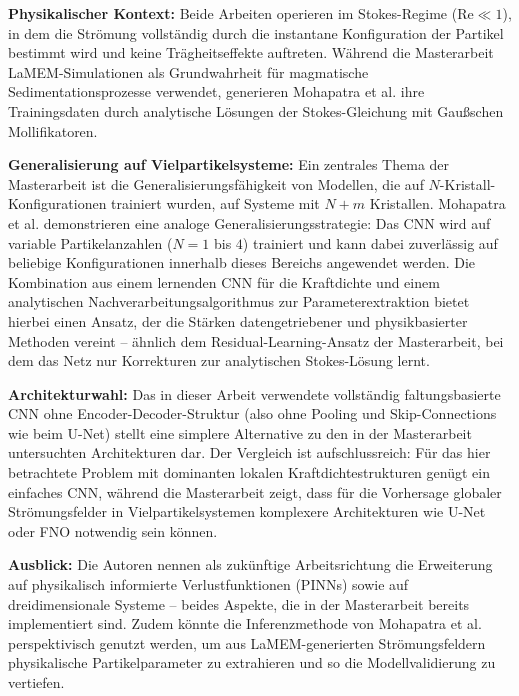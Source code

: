 \documentclass[a4paper,12pt]{article}
\begin{document}
\textbf{Physikalischer Kontext:} Beide Arbeiten operieren im Stokes-Regime ($\mathrm{Re} \ll 1$), in dem die Strömung vollständig durch die instantane Konfiguration der Partikel bestimmt wird und keine Trägheitseffekte auftreten. Während die Masterarbeit LaMEM-Simulationen als Grundwahrheit für magmatische Sedimentationsprozesse verwendet, generieren Mohapatra et al. ihre Trainingsdaten durch analytische Lösungen der Stokes-Gleichung mit Gaußschen Mollifikatoren.

\textbf{Generalisierung auf Vielpartikelsysteme:} Ein zentrales Thema der Masterarbeit ist die Generalisierungsfähigkeit von Modellen, die auf $N$-Kristall-Konfigurationen trainiert wurden, auf Systeme mit $N+m$ Kristallen. Mohapatra et al. demonstrieren eine analoge Generalisierungsstrategie: Das CNN wird auf variable Partikelanzahlen ($N = 1$ bis $4$) trainiert und kann dabei zuverlässig auf beliebige Konfigurationen innerhalb dieses Bereichs angewendet werden. Die Kombination aus einem lernenden CNN für die Kraftdichte und einem analytischen Nachverarbeitungsalgorithmus zur Parameterextraktion bietet hierbei einen Ansatz, der die Stärken datengetriebener und physikbasierter Methoden vereint – ähnlich dem Residual-Learning-Ansatz der Masterarbeit, bei dem das Netz nur Korrekturen zur analytischen Stokes-Lösung lernt.

\textbf{Architekturwahl:} Das in dieser Arbeit verwendete vollständig faltungsbasierte CNN ohne Encoder-Decoder-Struktur (also ohne Pooling und Skip-Connections wie beim U-Net) stellt eine simplere Alternative zu den in der Masterarbeit untersuchten Architekturen dar. Der Vergleich ist aufschlussreich: Für das hier betrachtete Problem mit dominanten lokalen Kraftdichtestrukturen genügt ein einfaches CNN, während die Masterarbeit zeigt, dass für die Vorhersage globaler Strömungsfelder in Vielpartikelsystemen komplexere Architekturen wie U-Net oder FNO notwendig sein können.

\textbf{Ausblick:} Die Autoren nennen als zukünftige Arbeitsrichtung die Erweiterung auf physikalisch informierte Verlustfunktionen (PINNs) sowie auf dreidimensionale Systeme – beides Aspekte, die in der Masterarbeit bereits implementiert sind. Zudem könnte die Inferenzmethode von Mohapatra et al. perspektivisch genutzt werden, um aus LaMEM-generierten Strömungsfeldern physikalische Partikelparameter zu extrahieren und so die Modellvalidierung zu vertiefen.
\end{document}
